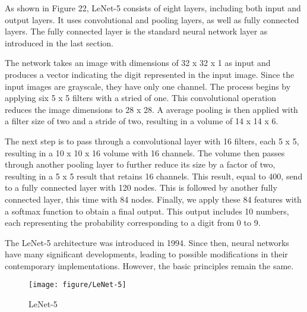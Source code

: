 \documentclass{article}
\begin{document}
As shown in Figure 22, LeNet-5 consists of eight layers, including both input and output layers. It uses convolutional and pooling layers, as well as fully connected layers. The fully connected layer is the standard neural network layer as introduced in the last section.

The network takes an image with dimensions of 32 x 32 x 1 as input and produces a vector indicating the digit represented in the input image. Since the input images are grayscale, they have only one channel. The process begins by applying six 5 x 5 filters with a stried of one. This convolutional operation reduces the image dimensions to 28 x 28. A average pooling is then applied with a filter size of two and a stride of two, resulting in a volume of 14 x 14 x 6.

The next step is to pass through a convolutional layer with 16 filters, each 5 x 5, resulting in a 10 x 10 x 16 volume with 16 channels. The volume then passes through another pooling layer to further reduce its size by a factor of two, resulting in a 5 x 5 result that retains 16 channels. This result, equal to 400, send to a fully connected layer with 120 nodes. This is followed by another fully connected layer, this time with 84 nodes. Finally, we apply these 84 features with a softmax function to obtain a final output. This output includes 10 numbers, each representing the probability corresponding to a digit from 0 to 9.

The LeNet-5 architecture was introduced in 1994. Since then, neural networks have many significant developments, leading to possible modifications in their contemporary implementations. However, the basic principles remain the same.


\begin{figure}[htbp]
        \centering
        \texttt{[image: figure/LeNet-5]}
        \caption{LeNet-5}
     \end{figure}


\begin{comment}
\newpage
\noindent
\textbf{implementation of a compete convolutional neural network}
\begin{lstlisting}
import tensorflow as tf
import tensorflow.keras.layers as tfl

#you'll hard-code some values such as the stride and kernel sizes.

input_img = tf.keras.Input(shape=input_shape)
Z1 = tfl.Conv2D(8, 4, activation='linear', padding="same", strides=1)(input_img)
A1 = tfl.ReLU()(Z1)
P1 = tfl.MaxPool2D(pool_size=(8, 8), strides=(8, 8), padding='same')(A1)
Z2 = tfl.Conv2D(16, 2, activation='linear', padding="same", strides=1)(P1)
A2 = tfl.ReLU()(Z2)
P2 = tfl.MaxPool2D(pool_size=(4, 4), strides=(4, 4), padding='same')(A2)
F = tfl.Flatten()(P2)
outputs = tfl.Dense(6, activation='softmax')(F)
model = tf.keras.Model(inputs=input_img, outputs=outputs)

\end{lstlisting}
\end{comment}
\end{document}
